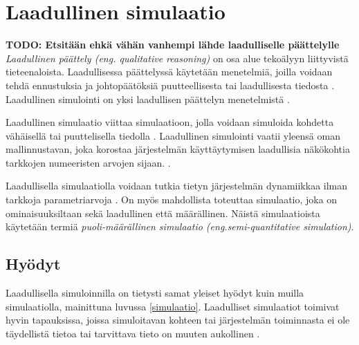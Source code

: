 \documentclass[utf8]{gradu3}
\begin{document}
\section{Laadullinen simulaatio} \label{laadullinen simulaatio}
\begin{comment}
    Tässä on kyse koko työn avainkäsitteestä, joten tää on syytä tehdä huolella. Nyt ei ole vielä mitään kovin selkeää määritelmää vaan muutama maininta, mitä voi tai voisi olla. Löytyisikö jostakin listaa millaisiin kysymyksiin laadullisella simuloinnilla voi vastata tai millaisia piirteitä kohteen ominaisuuksista voidaan tavoitella. Laadulliset näkökohdat ovat vielä aika ylätason kuvaus. Onko lähteissä kuvattu niitä paremmin?
\end{comment}
\textbf{TODO: Etsitään ehkä vähän vanhempi lähde laadulliselle päättelylle}
\textit{Laadullinen päättely (eng. qualitative reasoning)} on osa alue tekoälyyn
liittyvistä tieteenaloista. Laadullisessa päättelyssä käytetään menetelmiä, joilla
voidaan tehdä ennustuksia ja johtopäätöksiä puutteellisesta tai laadullisesta tiedosta
\parencite{qualitativeReasoning2014}.
Laadullinen simulointi on yksi laadullisen päättelyn menetelmistä \parencite{kuipers1986qualitative}. 

Laadullinen simulaatio viittaa simulaatioon, jolla voidaan simuloida kohdetta
vähäisellä tai puuttelisella tiedolla \parencite{kuipers1986qualitative}.
Laadullinen simulointi vaatii yleensä oman mallinnustavan, joka korostaa järjestelmän käyttäytymisen laadullisia näkökohtia tarkkojen numeeristen arvojen sijaan. 
%
\parencites%
  {parallelQualitativeSimulation1997}%
  {kuipers1986qualitative}%
\relax.
%

Laadullisella simulaatiolla voidaan tutkia tietyn järjestelmän dynamiikkaa ilman tarkkoja parametriarvoja \parencite{cosme2023history}. On myös mahdollista toteuttaa simulaatio, joka on ominaisuuksiltaan sekä laadullinen että määrällinen. Näistä simulaatioista käytetään termiä \textit{ puoli-määrällinen simulaatio (eng.semi-quantitative simulation)}\parencite{semiHybrid1997qualitative}.

\subsection{Hyödyt}
\begin{comment}
    Mietin, onko vähän liian suoraviivaista aloittaa hyödyistä kun määritelmä ja tavoitteet jäävät aika auki. tarvitaanko vahvemmin määrittelevä ja ominaisuuksia kuvaava alaluku. Nyt jää käteen vain vähän epämääräinen toteamus soveltuvuudesta tilanteessa jossa riittävän tarkat tiedot puuttuvat.
\end{comment}
Laadullisella simuloinnilla on tietysti samat yleiset hyödyt kuin muilla simulaatiolla, mainittuna luvussa \ref{simulaatio}. Laadulliset simulaatiot toimivat hyvin tapauksissa, joissa simuloitavan kohteen tai järjestelmän toiminnasta ei ole täydellistä tietoa tai tarvittava tieto on muuten aukollinen \parencite{kuipers1986qualitative}. 
\end{document}
